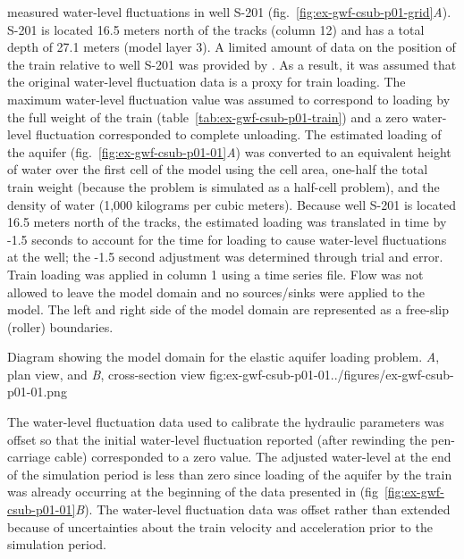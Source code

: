\cite{jacob1939fluctuations} measured water-level fluctuations in well S-201 (fig.~\ref{fig:ex-gwf-csub-p01-grid}\textit{A}). S-201 is located 16.5 meters north of the tracks (column 12) and has a total depth of 27.1 meters (model layer 3). A limited amount of data on the position of the train relative to well S-201 was provided by \cite{jacob1939fluctuations}. As a result, it was assumed that the original water-level fluctuation data is a proxy for train loading. The maximum water-level fluctuation value was assumed to correspond to loading by the full weight of the train (table~\ref{tab:ex-gwf-csub-p01-train}) and a zero water-level fluctuation corresponded to complete unloading. The estimated loading of the aquifer (fig.~\ref{fig:ex-gwf-csub-p01-01}\textit{A}) was converted to an equivalent height of water over the first cell of the model using the cell area, one-half the total train weight (because the problem is simulated as a half-cell problem), and the density of water (1,000 kilograms per cubic meters). Because well S-201 is located 16.5 meters north of the tracks, the estimated loading was translated in time by -1.5 seconds to account for the time for loading to cause water-level fluctuations at the well; the -1.5 second adjustment was determined through trial and error. Train loading was applied in column 1 using a time series file. Flow was not allowed to leave the model domain and no sources/sinks were applied to the model. The left and right side of the model domain are represented as a free-slip (roller) boundaries.

\begin{StandardFigure}{
                                     Diagram showing the model domain for the elastic aquifer 
                                     loading problem. \textit{A}, plan view, and \textit{B}, cross-section view
                                     }{fig:ex-gwf-csub-p01-01}{../figures/ex-gwf-csub-p01-01.png}
\end{StandardFigure}                                 

The water-level fluctuation data used to calibrate the hydraulic parameters was offset so that the initial water-level fluctuation reported (after rewinding the pen-carriage cable) corresponded to a zero value. The adjusted water-level at the end of the simulation period is less than zero since loading of the aquifer by the train was already occurring at the beginning of the data presented in \cite{jacob1939fluctuations} (fig~\ref{fig:ex-gwf-csub-p01-01}\textit{B}). The water-level fluctuation data was offset rather than extended because of uncertainties about the train velocity and acceleration prior to the simulation period.

